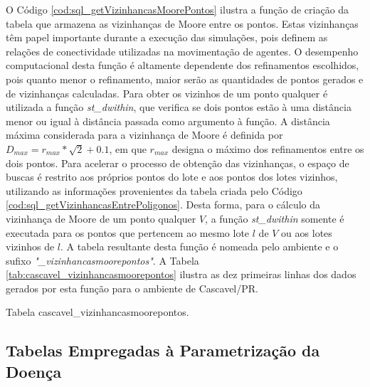 O Código \ref{cod:sql_getVizinhancasMoorePontos} ilustra a função de criação da tabela que armazena as vizinhanças de Moore entre os pontos. Estas vizinhanças têm papel importante durante a execução das simulações, pois definem as relações de conectividade utilizadas na movimentação de agentes. O desempenho computacional desta função é altamente dependente dos refinamentos escolhidos, pois quanto menor o refinamento, maior serão as quantidades de pontos gerados e de vizinhanças calculadas. Para obter os vizinhos de um ponto qualquer é utilizada a função \textit{st\_dwithin}, que verifica se dois pontos estão à uma distância menor ou igual à distância passada como argumento à função. A distância máxima considerada para a vizinhança de Moore é definida por $D_{max} = r_{max} * \sqrt{2} + 0.1$, em que $r_{max}$ designa o máximo dos refinamentos entre os dois pontos. Para acelerar o processo de obtenção das vizinhanças, o espaço de buscas é restrito aos próprios pontos do lote e aos pontos dos lotes vizinhos, utilizando as informações provenientes da tabela criada pelo Código \ref{cod:sql_getVizinhancasEntrePoligonos}. Desta forma, para o cálculo da vizinhança de Moore de um ponto qualquer $V$, a função \textit{st\_dwithin} somente é executada para os pontos que pertencem ao mesmo lote $l$ de $V$ ou aos lotes vizinhos de $l$. A tabela resultante desta função é nomeada pelo ambiente e o sufixo \textit{"\_vizinhancasmoorepontos"}. A Tabela \ref{tab:cascavel_vizinhancasmoorepontos} ilustra as dez primeiras linhas dos dados gerados por esta função para o ambiente de Cascavel/PR.



\begin{table}[H]
\centering
{}
\caption{Tabela cascavel\_vizinhancasmoorepontos.}
\label{tab:cascavel_vizinhancasmoorepontos}
\end{table}

\newpage

\subsection{Tabelas Empregadas à Parametrização da Doença}

